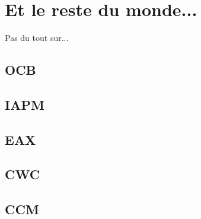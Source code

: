 
\chapter{Et le reste du monde...}
\label{chap:autres}

Pas du tout sur...

\section{OCB}

\section{IAPM}

\section{EAX}

\section{CWC}

\section{CCM}





